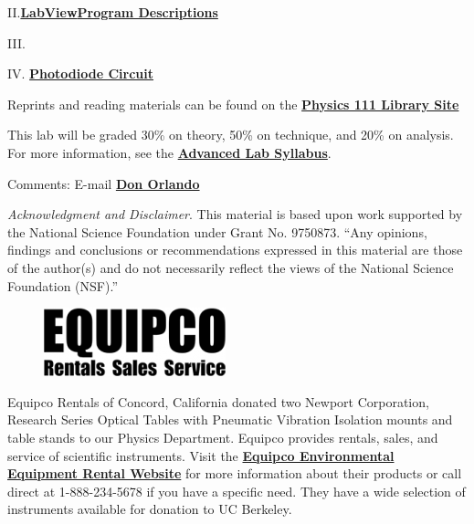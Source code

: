 \documentclass{../lab}
\begin{document}
II.\href{http://experimentationlab.berkeley.edu/node/119}{\textbf{}}\href{http://dev-physicsadv.pantheon.berkeley.edu/node/119}{\textbf{LabView}}\href{http://dev-physicsadv.pantheon.berkeley.edu/node/119}{\textbf{Program Descriptions}}

III.

IV. \href{http://experimentationlab.berkeley.edu/node/80}{\textbf{Photodiode Circuit}}

Reprints and reading materials can be found on the \href{http://physics111.lib.berkeley.edu/Physics111/Reprints/MNO/MNO\_index.html}{\textbf{Physics 111 Library Site}}

This lab will be graded 30\% on theory, 50\% on technique, and 20\% on analysis. For more information, see the \href{http://experimentationlab.berkeley.edu/syllabus}{\textbf{Advanced Lab Syllabus}}.

Comments: E-mail \href{\MailDonOrlando}{\textbf{Don Orlando}}

\emph{Acknowledgment and Disclaimer}. This material is based upon work supported by the National Science Foundation under Grant No. 9750873. ``Any opinions, findings and conclusions or recommendations expressed in this material are those of the author(s) and do not necessarily reflect the views of the National Science Foundation (NSF).''


\begin{figure}[h]
    \centering
    \href{http://experimentationlab.berkeley.edu/sites/default/files/images/199px-Equipco_logo.png}{\includegraphics[width=0.5\linewidth]{images/199px-Equipco_logo.png}}
    \caption{}
    \label{fig:199px-Equipco_logo}
\end{figure}

Equipco Rentals of Concord, California donated two Newport Corporation, Research Series Optical Tables with Pneumatic Vibration Isolation mounts and table stands to our Physics Department. Equipco provides rentals, sales, and service of scientific instruments. Visit the \href{http://www.equipcoservices.com/}{\textbf{Equipco Environmental Equipment Rental Website}} for more information about their products or call direct at 1-888-234-5678 if you have a specific need. They have a wide selection of instruments available for donation to UC Berkeley.
\end{document}

